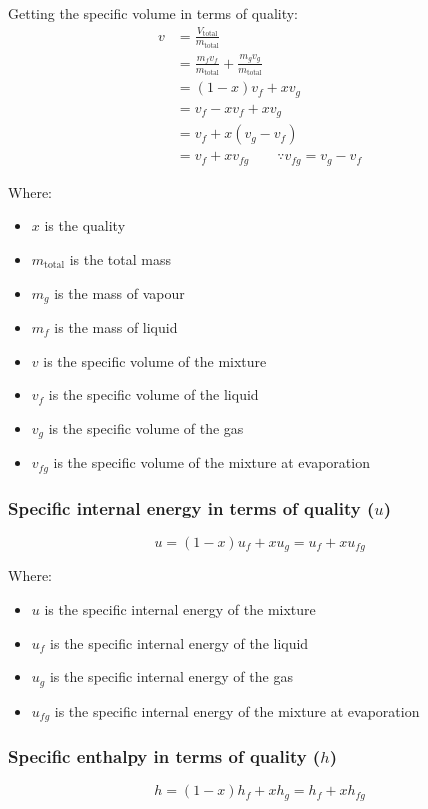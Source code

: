 \documentclass[11pt]{article}
\begin{document}
 \noindent Getting the specific volume in terms of quality:
\begin{align*}
v &= \frac{V_{\text{total}}}{m_{\text{total}}} \\
&= \frac{m_f v_f}{m_{\text{total}}} + \frac{m_g v_g}{m_{\text{total}}} \\
&= (1 - x) v_f + x v_g \\
&= v_f - x v_f + x v_g \\
&= v_f + x (v_g - v_f) \\
&= v_f + xv_{fg} \qquad \because v_{fg} = v_g - v_f
\end{align*}

Where:
\begin{itemize}
\item \(x\) is the quality
\item \(m_{\text{total}}\) is the total mass
\item \(m_g\) is the mass of vapour
\item \(m_f\) is the mass of liquid
\item \(v\) is the specific volume of the mixture
\item \(v_f\) is the specific volume of the liquid
\item \(v_g\) is the specific volume of the gas
\item \(v_{fg}\) is the specific volume of the mixture at evaporation
\end{itemize}

\newpage

\subsubsection{Specific internal energy in terms of quality (\(u\))}
\label{sec:org57657a8}
\[u = (1 - x) u_f + xu_g = u_f + x u_{fg}\]

Where:
\begin{itemize}
\item \(u\) is the specific internal energy of the mixture
\item \(u_f\) is the specific internal energy of the liquid
\item \(u_g\) is the specific internal energy of the gas
\item \(u_{fg}\) is the specific internal energy of the mixture at evaporation
\end{itemize}

\subsubsection{Specific enthalpy in terms of quality (\(h\))}
\label{sec:org7277785}
\[h = (1 - x) h_f + xh_g = h_f + x h_{fg}\]
\end{document}
